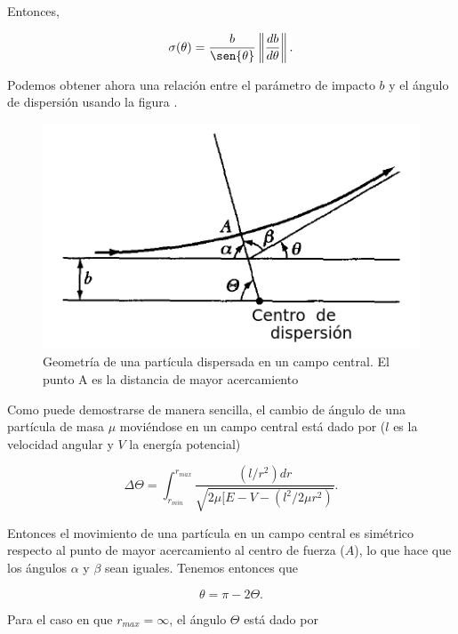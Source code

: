 \documentclass[a4paper,10pt]{article}
\numberwithin{equation}{section}
\begin{document}
Entonces,

\begin{equation}
 \sigma(\theta) = \frac{b}{\sen{\theta}}\left\| \frac{db}{d\theta} \right\|.
 \label{eq:disper6}
\end{equation}

Podemos obtener ahora una relación entre el parámetro de impacto $b$ y el 
ángulo de dispersión usando la figura .

\begin{figure}[H]
 \center
 \includegraphics[scale=0.5]{problema3fig3}
 \caption{Geometría de una partícula dispersada en un campo central. El punto
 A es la distancia de mayor acercamiento}
 \label{fig:problema3fig3}
\end{figure}

Como puede demostrarse de manera sencilla, el cambio de ángulo 
de una partícula de masa $\mu$ moviéndose en un campo central está
dado por ($l$ es la velocidad angular y $V$ la energía potencial)

\begin{equation}
 \Delta \Theta = \int_{r_{min}}^{r_{max}} \frac{(l/r^2)dr}{\sqrt{2\mu[
 E - V - (l^2/2\mu r^2)}}.
 \label{eq:disper7}
\end{equation}

Entonces el movimiento de una partícula en un campo central es simétrico
respecto al punto de mayor acercamiento al centro de fuerza ($A$), lo que
hace que los ángulos $\alpha$ y $\beta$ sean iguales. Tenemos entonces que 

\begin{equation}
 \theta = \pi - 2\Theta.
 \label{eq:disper8}
\end{equation}

Para el caso en que $r_{max} = \infty$, el ángulo $\Theta$ está dado por
\end{document}
